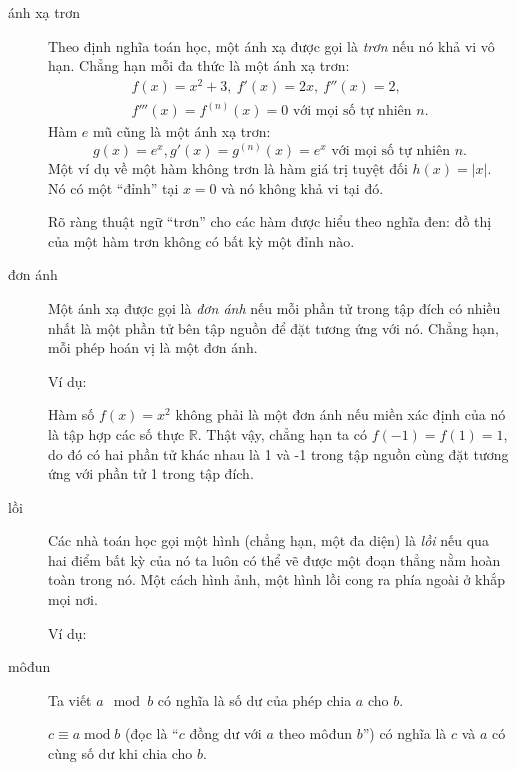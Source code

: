\begin{description}
	\item[ánh xạ trơn] Theo định nghĩa toán học, một ánh xạ được gọi là \emph{trơn} nếu nó khả vi vô hạn. Chẳng hạn mỗi đa thức là một ánh xạ trơn:
		\begin{gather*}
		f(x) = x^2 + 3,\ f'(x) = 2x,\ f''(x) = 2,\\
		f'''(x) = f^{(n)}(x) = 0 \text{ với mọi số tự nhiên } n.
		\end{gather*}
		Hàm $e$ mũ cũng là một ánh xạ trơn: 
		\begin{equation*}
		g(x) = e^x, g'(x) = g^{(n)}(x) = e^x \text{ với mọi số tự nhiên } n.
		\end{equation*}
		Một ví dụ về một hàm không trơn là hàm giá trị tuyệt đối $h(x) = |x|.$ Nó có một \enquote{đỉnh} tại $x=0$ và nó không khả vi tại đó.

		Rõ ràng thuật ngữ \enquote{trơn} cho các hàm được hiểu theo nghĩa đen: đồ thị của một hàm trơn không có bất kỳ một đỉnh nào.

	\item[đơn ánh] Một ánh xạ được gọi là \emph{đơn ánh} nếu mỗi phần tử trong tập đích có nhiều nhất là một phần tử bên tập nguồn để đặt tương ứng với nó. Chẳng hạn, mỗi phép hoán vị là một đơn ánh. 

		Ví dụ:
		\begin{figure}[H] 
			\centering 
			\def\svgwidth{200pt} 
			 
		\end{figure}
		Hàm số $f(x) = x^2$ không phải là một đơn ánh nếu miền xác định của nó là tập hợp các số thực $\mathbb R$. Thật vậy, chẳng hạn ta có $f(-1) = f(1) = 1$, do đó có hai phần tử khác nhau là 1 và -1 trong tập nguồn cùng đặt tương ứng với phần tử 1 trong tập đích.

	\item[lồi] Các nhà toán học gọi một hình (chẳng hạn, một đa diện) là \emph{lồi} nếu qua hai điểm bất kỳ của nó ta luôn có thể vẽ được một đoạn thẳng nằm hoàn toàn trong nó. Một cách hình ảnh, một hình lồi cong ra phía ngoài ở khắp mọi nơi.

		Ví dụ: 
		\begin{figure} 
			\def\svgwidth{270pt} 
			 
		\end{figure}

	\item[môđun] Ta viết $a \mod b$ có nghĩa là số dư của phép chia $a$ cho $b$. 

		$c\equiv a \operatorname{mod} b$ (đọc là \enquote{$c$ đồng dư với $a$ theo môđun $b$}) có nghĩa là $c$ và $a$ có cùng số dư khi chia cho $b$. 


\end{description}

